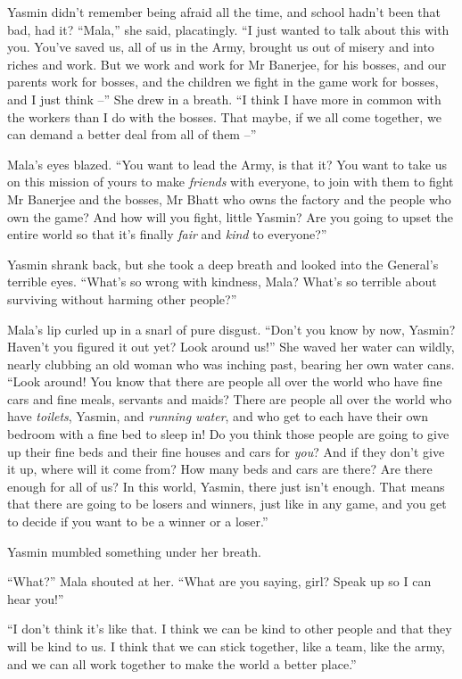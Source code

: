 Yasmin didn't remember being afraid all the time, and school hadn't
been that bad, had it? ``Mala,'' she said, placatingly. ``I just
wanted to talk about this with you. You've saved us, all of us in
the Army, brought us out of misery and into riches and work. But we
work and work for Mr Banerjee, for his bosses, and our parents work
for bosses, and the children we fight in the game work for bosses,
and I just think --'' She drew in a breath. ``I think I have more in
common with the workers than I do with the bosses. That maybe, if
we all come together, we can demand a better deal from all of them
--''

Mala's eyes blazed. ``You want to lead the Army, is that it? You
want to take us on this mission of yours to make \emph{friends}
with everyone, to join with them to fight Mr Banerjee and the
bosses, Mr Bhatt who owns the factory and the people who own the
game? And how will you fight, little Yasmin? Are you going to upset
the entire world so that it's finally \emph{fair} and \emph{kind}
to everyone?''

Yasmin shrank back, but she took a deep breath and looked into the
General's terrible eyes. ``What's so wrong with kindness, Mala?
What's so terrible about surviving without harming other people?''

Mala's lip curled up in a snarl of pure disgust. ``Don't you know by
now, Yasmin? Haven't you figured it out yet? Look around us!'' She
waved her water can wildly, nearly clubbing an old woman who was
inching past, bearing her own water cans. ``Look around! You know
that there are people all over the world who have fine cars and
fine meals, servants and maids? There are people all over the world
who have \emph{toilets}, Yasmin, and \emph{running water}, and who
get to each have their own bedroom with a fine bed to sleep in! Do
you think those people are going to give up their fine beds and
their fine houses and cars for \emph{you}? And if they don't give
it up, where will it come from? How many beds and cars are there?
Are there enough for all of us? In this world, Yasmin, there just
isn't enough. That means that there are going to be losers and
winners, just like in any game, and you get to decide if you want
to be a winner or a loser.''

Yasmin mumbled something under her breath.

``What?'' Mala shouted at her. ``What are you saying, girl? Speak up
so I can hear you!''

``I don't think it's like that. I think we can be kind to other
people and that they will be kind to us. I think that we can stick
together, like a team, like the army, and we can all work together
to make the world a better place.''

